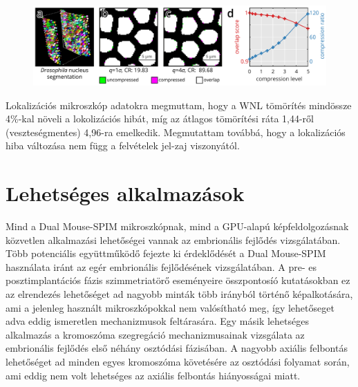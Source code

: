 \documentclass{booklet_style}
\begin{document}
    \begin{figure}
      \centering
      \includegraphics[page=1,width=\textwidth]{4_gpu/LLvsB3D}
      \label{fig:wnlDroso}
    \end{figure}

    Lokalizációs mikroszkóp adatokra megmuttam, hogy a WNL tömörítés mindössze 4\%-kal növeli a lokolizációs hibát, míg az átlagos tömörítési ráta 1,44-ről (veszteségmentes) 4,96-ra emelkedik. Megmutattam továbbá, hogy a lokalizációs hiba változása nem függ a felvételek jel-zaj viszonyától.

    


\section{Lehetséges alkalmazások}
Mind a Dual Mouse-SPIM mikroszkópnak, mind a GPU-alapú képfeldolgozásnak közvetlen alkalmazási lehetőségei vannak az embrionális fejlődés vizsgálatában. Több potenciális együttműködő fejezte ki érdeklődését a Dual Mouse-SPIM használata iránt az egér embrionális fejlődésének vizsgálatában. A pre- es posztimplantációs fázis szimmetriatörő eseményeire összpontosíó kutatásokban ez az elrendezés lehetőséget ad nagyobb minták több irányból történő képalkotására, ami a jelenleg használt mikroszkópokkal nem valósítható meg, így lehetőseget adva eddig ismeretlen mechanizmusok feltárasára. Egy másik lehetséges alkalmazás a kromoszóma szegregáció mechanizmusainak vizsgálata az embrionális fejlődés első néhány osztódási fázisában. A nagyobb axiális felbontás lehetőséget ad minden egyes kromoszóma követésére az osztódási folyamat során, ami eddig nem volt lehetséges az axiális felbontás hiányosságai miatt.
\end{document}
